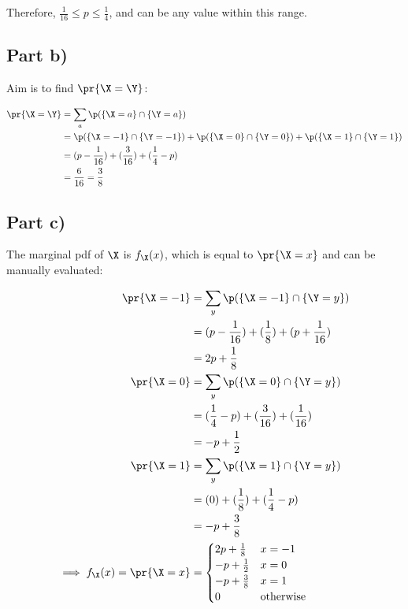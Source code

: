 Therefore, $\frac{1}{16} \leq p \leq \frac{1}{4}$, and can be any value within this range.

\subsection{Part b)}
Aim is to find $\pr{\X = \Y}$:

\begin{align*}
\pr{\X = \Y} &= \sum _{a} \p(\{ \X = a \} \cap \{ \Y = a \}) \\
&= \p(\{ \X = -1 \} \cap \{ \Y = -1 \}) + \p(\{ \X = 0 \} \cap \{ \Y = 0 \}) + \p(\{ \X = 1 \} \cap \{ \Y = 1 \}) \\
&= (p - \frac{1}{16}) + (\frac{3}{16}) + (\frac{1}{4} - p) \\
&= \frac{6}{16} = \frac{3}{8}
\end{align*}

\subsection{Part c)}
The marginal pdf of $\X$ is $f_{\X}(x)$, which is equal to $\pr{\X = x}$ and can be manually evaluated:

\begin{align*}
\pr{\X = -1} &= \sum _y \p(\{ \X = -1 \} \cap \{ \Y = y \}) \\
&= (p - \frac{1}{16}) + (\frac{1}{8}) + (p + \frac{1}{16}) \\
&= 2p + \frac{1}{8} \\
\pr{\X = 0} &= \sum _y \p(\{ \X = 0 \} \cap \{ \Y = y \}) \\
&= (\frac{1}{4} - p) + (\frac{3}{16}) + (\frac{1}{16}) \\
&= -p + \frac{1}{2} \\
\pr{\X = 1} &= \sum _y \p(\{ \X = 1 \} \cap \{ \Y = y \}) \\
&= (0) + (\frac{1}{8}) + (\frac{1}{4} - p) \\
&= -p + \frac{3}{8} \\
\implies f_{\X}(x) = \pr{\X = x} &= \begin{cases}
2p + \frac{1}{8} & x = -1 \\
-p + \frac{1}{2} & x = 0 \\
-p + \frac{3}{8} & x = 1 \\
0 & \text{otherwise}
\end{cases}
\end{align*}

